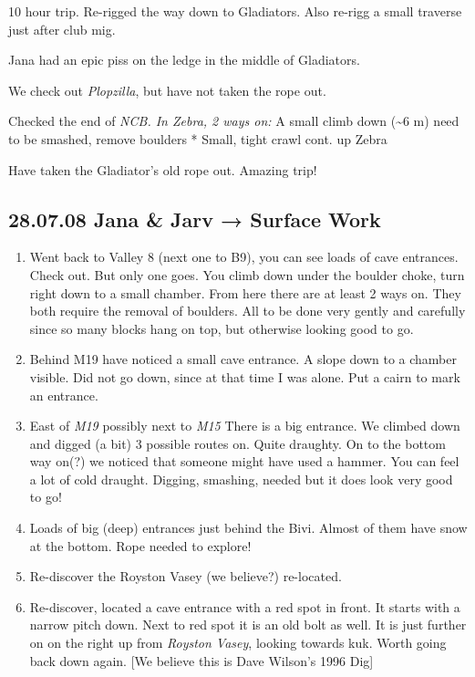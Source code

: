 10 hour trip. Re-rigged the way down to Gladiators. Also re-rigg a small
traverse just after club mig.

Jana had an epic piss on the ledge in the middle of Gladiators.

We check out \emph{Plopzilla}, but have not taken the rope out.

Checked the end of \emph{NCB. In Zebra, 2 ways on: } A small climb down
(\textasciitilde6 m) need to be smashed, remove boulders * Small, tight
crawl cont. up Zebra

Have taken the Gladiator's old rope out. Amazing trip! 

\hypertarget{jana-jarv-surface-work}{%
\subsection{28.07.08 Jana \& Jarv → Surface
Work}\label{jana-jarv-surface-work}}

\begin{enumerate}
\def\labelenumi{\arabic{enumi}.}
\tightlist
\item
  Went back to Valley 8 (next one to B9), you can see loads of cave
  entrances. Check out. But only one goes. You climb down under the
  boulder choke, turn right down to a small chamber. From here there are
  at least 2 ways on. They both require the removal of boulders. All to
  be done very gently and carefully since so many blocks hang on top,
  but otherwise looking good to go.
\item
  Behind M19 have noticed a small cave entrance. A slope down to a
  chamber visible. Did not go down, since at that time I was alone. Put
  a cairn to mark an entrance.
\item
  East of \emph{M19} possibly next to \emph{M15} There is a big
  entrance. We climbed down and digged (a bit) 3 possible routes on.
  Quite draughty. On to the bottom way on(?) we noticed that someone
  might have used a hammer. You can feel a lot of cold draught. Digging,
  smashing, needed but it does look very good to go!
\item
  Loads of big (deep) entrances just behind the Bivi. Almost of them
  have snow at the bottom. Rope needed to explore!
\item
  Re-discover the Royston Vasey (we believe?) re-located.
\item
  Re-discover, located a cave entrance with a red spot in front. It
  starts with a narrow pitch down. Next to red spot it is an old bolt as
  well. It is just further on on the right up from \emph{Royston Vasey},
  looking towards kuk. Worth going back down again. {[}We believe this
  is Dave Wilson's 1996 Dig{]}
\end{enumerate}

